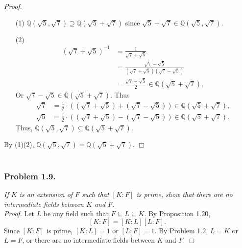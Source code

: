 \documentclass{article}
\begin{document}
\emph{Proof.}
\begin{enumerate}
\item[(1)]
$\mathbb{Q}(\sqrt{5}, \sqrt{7}) \supseteq \mathbb{Q}(\sqrt{5} + \sqrt{7})$
since $\sqrt{5} + \sqrt{7} \in \mathbb{Q}(\sqrt{5}, \sqrt{7})$.
\item[(2)]
\begin{align*}
(\sqrt{7} + \sqrt{5})^{-1}
&= \frac{1}{\sqrt{7} + \sqrt{5}} \\
&= \frac{\sqrt{7} - \sqrt{5}}{(\sqrt{7} + \sqrt{5})(\sqrt{7} - \sqrt{5})} \\
&= \frac{\sqrt{7} - \sqrt{5}}{2} \in \mathbb{Q}(\sqrt{5} + \sqrt{7}),
\end{align*}
Or $\sqrt{7} - \sqrt{5} \in \mathbb{Q}(\sqrt{5} + \sqrt{7})$. Thus
\begin{align*}
\sqrt{7}
&= \frac{1}{2} \cdot ((\sqrt{7} + \sqrt{5}) + (\sqrt{7} - \sqrt{5}))
\in \mathbb{Q}(\sqrt{5} + \sqrt{7}), \\
\sqrt{5}
&= \frac{1}{2} \cdot ((\sqrt{7} + \sqrt{5}) - (\sqrt{7} - \sqrt{5}))
\in \mathbb{Q}(\sqrt{5} + \sqrt{7}).
\end{align*}
Thus, $\mathbb{Q}(\sqrt{5}, \sqrt{7}) \subseteq \mathbb{Q}(\sqrt{5} + \sqrt{7})$.
\end{enumerate}
By (1)(2), $\mathbb{Q}(\sqrt{5}, \sqrt{7}) = \mathbb{Q}(\sqrt{5} + \sqrt{7})$.
$\Box$ \\\\






\subsubsection*{Problem 1.9.}
\emph{If $K$ is an extension of $F$ such that $[K:F]$ is prime,
show that there are no intermediate fields between $K$ and $F$.} \\

\emph{Proof.}
Let $L$ be any field such that $F \subseteq L \subseteq K$.
By Proposition 1.20,
$$[K:F] = [K:L][L:F].$$
Since $[K:F]$ is prime, $[K:L] = 1$ or $[L:F] = 1$.
By Problem 1.2, $L=K$ or $L=F$,
or there are no intermediate fields between $K$ and $F$.
$\Box$ \\\\
\end{document}
